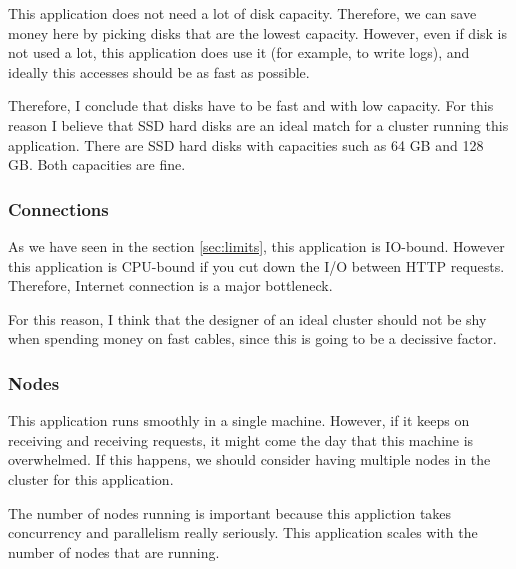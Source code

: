 This application does not need a lot of disk capacity. Therefore, we can save
money here by picking disks that are the lowest capacity. However, even if disk
is not used a lot, this application does use it (for example, to write logs),
and ideally this accesses should be as fast as possible.

Therefore, I conclude that disks have to be fast and with low capacity. For
this reason I believe that SSD hard disks are an ideal match for a cluster
running this application. There are SSD hard disks with capacities such as 64
GB and 128 GB. Both capacities are fine.

\subsubsection*{Connections}

As we have seen in the section \ref{sec:limits}, this application is IO-bound.
However this application is CPU-bound if you cut down the I/O between HTTP
requests. Therefore, Internet connection is a major bottleneck.

For this reason, I think that the designer of an ideal cluster should not be
shy when spending money on fast cables, since this is going to be a decissive
factor.

\subsubsection*{Nodes}

This application runs smoothly in a single machine. However, if it keeps on
receiving and receiving requests, it might come the day that this machine is
overwhelmed. If this happens, we should consider having multiple nodes in the
cluster for this application.

The number of nodes running is important because this appliction takes
concurrency and parallelism really seriously. This application scales with the
number of nodes that are running.
